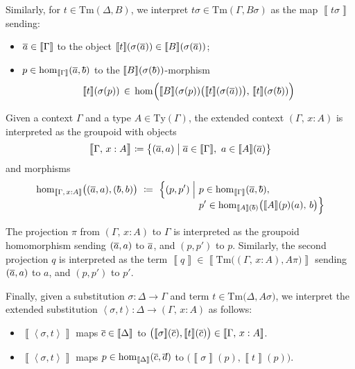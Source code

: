\documentclass{article}
\theoremstyle{definition}
\renewcommand{\int}[1]{\mathopen{}\left\llbracket #1
    \right\rrbracket\mathclose{}}       %
\newcommand{\substType}[2]{#2#1}%
\newcommand{\substTerm}[2]{#2#1}%
\newcommand{\extsub}[2]{\ang{#1,#2}}
\newcommand{\Ty}{\mathrm{Ty}}
\newcommand{\Tm}{\mathrm{Tm}}
\renewcommand{\hom}[3][]{\mathrm{hom}_{#1}\mathopen{}\left( #2, #3 \right)\mathclose{}}
\newcommand{\defeq}{
	\mathrel{\mathrel{\mathop:}\mkern-1.2mu=}}	%
\newcommand{\tup}[1]{\overline{\smash{#1}\vphantom{a}}}
\newcommand{\ang}[1]{\mathopen{}\left\langle #1 \right\rangle\mathclose{}}
\begin{document}
Similarly, for $t \in \Tm(\Delta,B)$, we interpret $\substTerm{\sigma}{t} \in \Tm(\Gamma,\substType{\sigma}{B})$ as the map $\int{\substTerm{\sigma}{t}}$ sending:
\begin{itemize}
    \item $\tup{a} \in \int{\Gamma}$ to the object $\int{t}(\sigma(\tup{a})) \in \int{B}(\sigma(\tup{a}))$;
    
    \item $p \in \hom[\int{\Gamma}]{\tup{a}}{\tup{b}}$ to the $\int{B}(\sigma(\tup{b}))$-morphism $$\int{t}(\sigma(p))\, \in\, \hom{\Big.\int{B}(\sigma(p)) \big( \int{t}(\sigma(\tup{a})) \big)}{\,\int{t}(\sigma(\tup{b}))}$$
\end{itemize}

Given a context $\Gamma$ and a type $A \in \Ty(\Gamma)$, the extended context $(\Gamma,\, x : A)$ is interpreted as the groupoid with objects
$$\int{\big.\Gamma,\, x : A} \defeq \big\{ (\tup{a},a) \mathrel{\big|} \tup{a} \in \int{\Gamma},\ a \in \int{A}(\tup{a}) \big\}$$
and morphisms
\begin{align*}
    \hom[\int{\Gamma,\, x : A}]{\big.(\tup{a},a)}{(\tup{b},b)}\ \defeq\ \Big\{ (p,p') \mathrel{\Big|}\ &p \in \hom[\int{\Gamma}]{\tup{a}}{\tup{b}},\\[-2mm]
    &p' \in \hom[\int{A}(\tup{b})]{\big.\int{A}(p)(a)}{\,b} \Big\}
\end{align*}

The projection $\pi$ from $(\Gamma,\, x : A)$ to $\Gamma$ is interpreted as the groupoid homomorphism sending $(\tup{a},a)$ to $\tup{a}$, and $(p,p')$ to $p$. Similarly, the second projection $q$ is interpreted as the term $\int{q} \in \int{\Tm \big( (\Gamma,\, x : A), \substType{\pi}{A} \big)}$ sending $(\tup{a},a)$ to $a$, and $(p,p')$ to $p'$.

Finally, given a substitution $\sigma\colon \Delta \to \Gamma$ and term $t \in \Tm \big( \Delta, \substType{\sigma}{A} \big)$, we interpret the extended substitution $\extsub{\sigma}{t}: \Delta \to (\Gamma,\, x : A)$ as follows:
\begin{itemize}
    \item $\int{\extsub{\sigma}{t}}$ maps $\tup{c} \in \int{\Delta}$ to $\big( \int{\sigma}(\tup{c}), \int{t}(\tup{c}) \big) \in \int{\Gamma,\, x : A}$.
    
    \item $\int{\extsub{\sigma}{t}}$ maps $p \in \hom[\int{\Delta}]{\tup{c}}{\tup{d}}$ to $\big( \int{\sigma}(p), \int{t}(p) \big)$.
\end{itemize}
\end{document}
